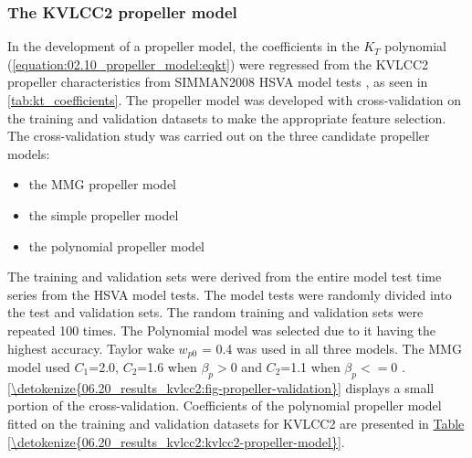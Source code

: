 \subsubsection{The KVLCC2 propeller model}
\label{\detokenize{06.20_results_kvlcc2:the-kvlcc2-propeller-model}}\label{\detokenize{06.20_results_kvlcc2:results-propeller-model}}

In the development of a propeller model, the coefficients in the \(K_T\) polynomial (\autoref{equation:02.10_propeller_model:eqkt}) were regressed from the KVLCC2 propeller characteristics from SIMMAN2008 HSVA model tests \cite{stern_experience_2011}, as seen in \autoref{tab:kt_coefficients}. The propeller model was developed with cross-validation on the training and validation datasets to make the appropriate feature selection.
The cross-validation study was carried out on the three candidate propeller models: 
\vspace{5pt}
\begin{itemize}
    \setlength\itemsep{5pt}
    \item the MMG propeller model
    \item the simple propeller model
    \item the polynomial propeller model
\end{itemize}
\vspace{5pt}
The training and validation sets were derived from the entire model test time series from the HSVA model tests. The model tests were randomly divided into the test and validation sets. The random training and validation sets were repeated 100 times. The Polynomial model was selected due to it having the highest accuracy. Taylor wake \(w_{p0}\) = {0.4} was used in all three models. The MMG model used \(C_1\)={2.0}, \(C_2\)={1.6} when \(\beta_p>0\) and \(C_2\)={1.1} when \(\beta_p<=0\) \cite{yasukawa_introduction_2015-1}. \hyperref[\detokenize{06.20_results_kvlcc2:fig-propeller-validation}]{\autoref{\detokenize{06.20_results_kvlcc2:fig-propeller-validation}}} displays a small portion of the cross-validation. Coefficients of the polynomial propeller model fitted on the training and validation datasets for KVLCC2 are presented in \hyperref[\detokenize{06.20_results_kvlcc2:kvlcc2-propeller-model}]{Table \ref{\detokenize{06.20_results_kvlcc2:kvlcc2-propeller-model}}}.

